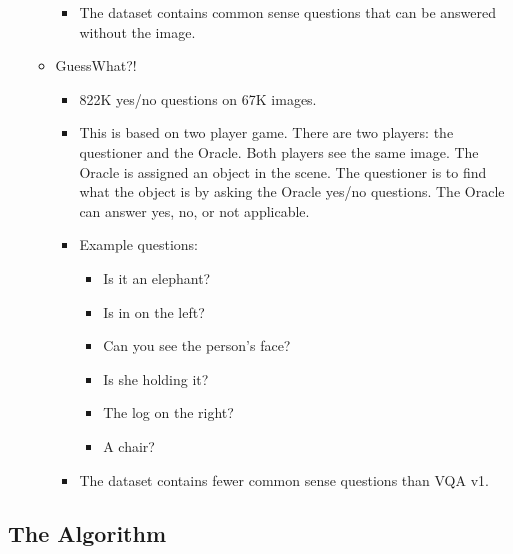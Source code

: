 \documentclass[10pt]{article}
\begin{document}
\begin{itemize}
\begin{itemize}
\begin{itemize}
        \item The dataset contains common sense questions that can be answered without the image.
      \end{itemize}

      \item GuessWhat?! \cite{deVries:2017:GuessWhat}

      \begin{itemize}
        \item 822K yes/no questions on 67K images.

        \item This is based on two player game. There are two players: the questioner and the Oracle. Both players see the same image. The Oracle is assigned an object in the scene. The questioner is to find what the object is by asking the Oracle yes/no questions. The Oracle can answer yes, no, or not applicable.

        \item Example questions:
        \begin{itemize}
          \item Is it an elephant?
          \item Is in on the left?
          \item Can you see the person's face?
          \item Is she holding it?
          \item The log on the right?
          \item A chair? 
        \end{itemize}

        \item The dataset contains fewer common sense questions than VQA v1.
      \end{itemize}
    \end{itemize}
  \end{itemize}

  \subsection{The Algorithm}
\end{document}
